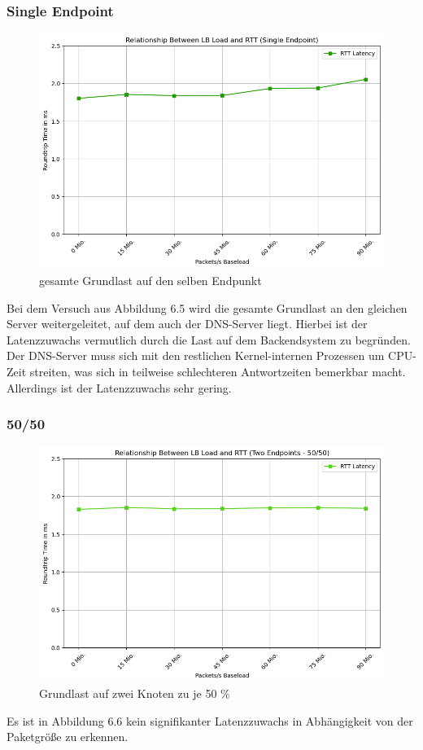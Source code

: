 \subsubsection{Single Endpoint}
\begin{figure}
    \centering
    \includegraphics[width=0.8\linewidth]{images/single.png}
    \caption{gesamte Grundlast auf den selben Endpunkt}
    \label{fig:enter-label}
\end{figure}
Bei dem Versuch aus Abbildung 6.5 wird die gesamte Grundlast an den gleichen Server weitergeleitet, auf dem auch der DNS-Server liegt. Hierbei ist der Latenzzuwachs vermutlich durch die Last auf dem Backendsystem zu begründen. Der DNS-Server muss sich mit den restlichen Kernel-internen Prozessen um CPU-Zeit streiten, was sich in teilweise schlechteren Antwortzeiten bemerkbar macht. Allerdings ist der Latenzzuwachs sehr gering.
\subsubsection{50/50}
\begin{figure}
    \centering
    \includegraphics[width=0.8\linewidth]{images/50_50.png}
    \caption{Grundlast auf zwei Knoten zu je 50 \%}
    \label{fig:enter-label}
\end{figure}
Es ist in Abbildung 6.6 kein signifikanter Latenzzuwachs in Abhängigkeit von der Paketgröße zu erkennen.
